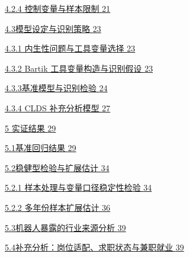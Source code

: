 \hyperref[ux63a7ux5236ux53d8ux91cfux4e0eux6837ux672cux9650ux5236]{4.2.4 控制变量与样本限制 \hyperref[ux63a7ux5236ux53d8ux91cfux4e0eux6837ux672cux9650ux5236]{21}}

\hyperref[ux6a21ux578bux8bbeux5b9aux4e0eux8bc6ux522bux7b56ux7565]{4.3模型设定与识别策略 \hyperref[ux6a21ux578bux8bbeux5b9aux4e0eux8bc6ux522bux7b56ux7565]{23}}

\hyperref[ux5185ux751fux6027ux95eeux9898ux4e0eux5de5ux5177ux53d8ux91cfux9009ux62e9]{4.3.1 内生性问题与工具变量选择 \hyperref[ux5185ux751fux6027ux95eeux9898ux4e0eux5de5ux5177ux53d8ux91cfux9009ux62e9]{23}}

\hyperref[bartik-ux5de5ux5177ux53d8ux91cfux6784ux9020ux4e0eux8bc6ux522bux5047ux8bbe]{4.3.2 Bartik 工具变量构造与识别假设 \hyperref[bartik-ux5de5ux5177ux53d8ux91cfux6784ux9020ux4e0eux8bc6ux522bux5047ux8bbe]{23}}

\hyperref[ux57faux51c6ux6a21ux578bux4e0eux8bc6ux522bux68c0ux9a8c]{4.3.3基准模型与识别检验 \hyperref[ux57faux51c6ux6a21ux578bux4e0eux8bc6ux522bux68c0ux9a8c]{24}}

\hyperref[clds-ux8865ux5145ux5206ux6790ux6a21ux578b]{4.3.4 CLDS 补充分析模型 \hyperref[clds-ux8865ux5145ux5206ux6790ux6a21ux578b]{27}}

\hyperref[ux5b9eux8bc1ux7ed3ux679c]{5 实证结果 \hyperref[ux5b9eux8bc1ux7ed3ux679c]{29}}

\hyperref[ux57faux51c6ux56deux5f52ux7ed3ux679c]{5.1基准回归结果 \hyperref[ux57faux51c6ux56deux5f52ux7ed3ux679c]{29}}

\hyperref[ux7a33ux5065ux578bux68c0ux9a8cux4e0eux6269ux5c55ux4f30ux8ba1]{5.2稳健型检验与扩展估计 \hyperref[ux7a33ux5065ux578bux68c0ux9a8cux4e0eux6269ux5c55ux4f30ux8ba1]{34}}

\hyperref[ux6837ux672cux5904ux7406ux4e0eux53d8ux91cfux53e3ux5f84ux7a33ux5b9aux6027ux68c0ux9a8c]{5.2.1 样本处理与变量口径稳定性检验 \hyperref[ux6837ux672cux5904ux7406ux4e0eux53d8ux91cfux53e3ux5f84ux7a33ux5b9aux6027ux68c0ux9a8c]{34}}

\hyperref[ux591aux5e74ux4efdux6837ux672cux6269ux5c55ux4f30ux8ba1]{5.2.2 多年份样本扩展估计 \hyperref[ux591aux5e74ux4efdux6837ux672cux6269ux5c55ux4f30ux8ba1]{36}}

\hyperref[ux673aux5668ux4ebaux66b4ux9732ux7684ux884cux4e1aux6765ux6e90ux5206ux6790]{5.3机器人暴露的行业来源分析 \hyperref[ux673aux5668ux4ebaux66b4ux9732ux7684ux884cux4e1aux6765ux6e90ux5206ux6790]{39}}

\hyperref[ux8865ux5145ux5206ux6790ux5c97ux4f4dux9002ux914dux6c42ux804cux72b6ux6001ux4e0eux517cux804cux5c31ux4e1a]{5.4补充分析：岗位适配、求职状态与兼职就业 \hyperref[ux8865ux5145ux5206ux6790ux5c97ux4f4dux9002ux914dux6c42ux804cux72b6ux6001ux4e0eux517cux804cux5c31ux4e1a]{39}}

